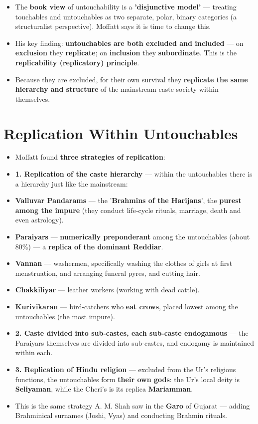 \begin{KeyConcept}
\begin{itemize}
\item The \textbf{book view} of untouchability is a \textbf{'disjunctive model'} --- treating touchables and untouchables as two separate, polar, binary categories (a structuralist perspective). Moffatt says it is time to change this.
\item His key finding: \textbf{untouchables are both excluded and included} --- on \textbf{exclusion} they \textbf{replicate}; on \textbf{inclusion} they \textbf{subordinate}. This is the \textbf{replicability (replicatory) principle}.
\item Because they are excluded, for their own survival they \textbf{replicate the same hierarchy and structure} of the mainstream caste society within themselves.
\end{itemize}
\end{KeyConcept}

\section{Replication Within Untouchables}

\begin{KeyConcept}
\begin{itemize}
\item Moffatt found \textbf{three strategies of replication}:
\item \textbf{1. Replication of the caste hierarchy} --- within the untouchables there is a hierarchy just like the mainstream:
\item \textbf{Valluvar Pandarams} --- the '\textbf{Brahmins of the Harijans}', the \textbf{purest among the impure} (they conduct life-cycle rituals, marriage, death and even astrology).
\item \textbf{Paraiyars} --- \textbf{numerically preponderant} among the untouchables (about 80\%) --- a \textbf{replica of the dominant Reddiar}.
\item \textbf{Vannan} --- washermen, specifically washing the clothes of girls at first menstruation, and arranging funeral pyres, and cutting hair.
\item \textbf{Chakkiliyar} --- leather workers (working with dead cattle).
\item \textbf{Kurivikaran} --- bird-catchers who \textbf{eat crows}, placed lowest among the untouchables (the most impure).
\item \textbf{2. Caste divided into sub-castes, each sub-caste endogamous} --- the Paraiyars themselves are divided into sub-castes, and endogamy is maintained within each.
\item \textbf{3. Replication of Hindu religion} --- excluded from the Ur's religious functions, the untouchables form \textbf{their own gods}: the Ur's local deity is \textbf{Seliyaman}, while the Cheri's is its replica \textbf{Mariamman}.
\item This is the same strategy A. M. Shah saw in the \textbf{Garo} of Gujarat --- adding Brahminical surnames (Joshi, Vyas) and conducting Brahmin rituals.
\end{itemize}
\end{KeyConcept}

